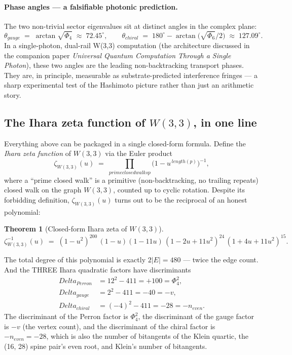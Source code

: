\documentclass[11pt]{article}
\def\text#1{#1}%
\def\Delta{Delta}%
\def\Phi#1{Phi#1}%
\def\cdot{ }%
\newtheorem*{theorem}{Theorem}
\begin{document}
\paragraph{Phase angles --- a falsifiable photonic prediction.}
The two non-trivial sector eigenvalues sit at distinct angles in the
complex plane:
\[
\theta_{\text{gauge}}  \;=\; \arctan\!\sqrt{\Phi_4} \;\approx\; 72.45^\circ,
\qquad
\theta_{\text{chiral}} \;=\; 180^\circ - \arctan\!\bigl(\sqrt{\Phi_6}/2\bigr)
                         \;\approx\; 127.09^\circ.
\]
In a single-photon, dual-rail W(3,3) computation (the architecture
discussed in the companion paper \emph{Universal Quantum Computation
Through a Single Photon}), these two angles are the leading
non-backtracking transport phases.  They are, in principle, measurable
as substrate-predicted interference fringes --- a sharp experimental
test of the Hashimoto picture rather than just an arithmetic story.

\subsection*{The Ihara zeta function of $W(3,3)$, in one line}

Everything above can be packaged in a single closed-form formula.
Define the \emph{Ihara zeta function} of $W(3,3)$ via the Euler product
\[
\zeta_{W(3,3)}(u) \;=\; \prod_{\text{prime closed walks } p}
                       \bigl(1 - u^{\,\text{length}(p)}\bigr)^{-1},
\]
where a ``prime closed walk'' is a primitive (non-backtracking, no
trailing repeats) closed walk on the graph $W(3,3)$, counted up to
cyclic rotation.  Despite its forbidding definition, $\zeta_{W(3,3)}(u)$
turns out to be the reciprocal of an honest polynomial:

\begin{theorem}[Closed-form Ihara zeta of $W(3,3)$]
\[
\boxed{
\zeta_{W(3,3)}^{-1}(u) \;=\; (1 - u^2)^{200}\,(1 - u)(1 - 11 u)\,
                            (1 - 2 u + 11 u^2)^{24}\,(1 + 4 u + 11 u^2)^{15}.
}
\]
\end{theorem}

The total degree of this polynomial is exactly $2 |E| = 480$ ---
twice the edge count.  And the THREE Ihara quadratic factors have
discriminants
\[
\begin{aligned}
\Delta_{\text{Perron}}  &= 12^2 - 4\!\cdot\!11 = +100 = \Phi_4^2,\\
\Delta_{\text{gauge}}   &= 2^2 - 4\!\cdot\!11 = -40 = -v,\\
\Delta_{\text{chiral}}  &= (-4)^2 - 4\!\cdot\!11 = -28 = -n_{\text{even}}.
\end{aligned}
\]
The discriminant of the Perron factor is $\Phi_4^2$, the discriminant
of the gauge factor is $-v$ (the vertex count), and the discriminant
of the chiral factor is $-n_{\text{even}} = -28$, which is also the
number of bitangents of the Klein quartic, the (16, 28) spine pair's
even root, and Klein's number of bitangents.
\end{document}
